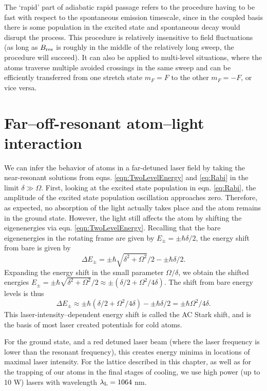 The \lq{rapid}\rq{} part of adiabatic rapid passage refers to the procedure having to be fast with respect to the spontaneous emission timescale, since in the coupled basis there is some population in the excited state and spontaneous decay would disrupt the process. This procedure is relatively insensitive to field fluctuations (as long as $B_{\rm res}$ is roughly in the middle of the relatively long sweep, the procedure will succeed). It can also be applied to multi-level situations, where the atoms traverse multiple avoided crossings in the same sweep and can be efficiently transferred from one stretch state $m_F=F$ to the other $m_F=-F$, or vice versa. 



\section{Far--off-resonant atom--light interaction}\label{sec:FoRatomLight}

	We can infer the behavior of atoms in a far-detuned laser field by taking the near-resonant solutions from eqns. \ref{eqn:TwoLevelEnergy} and \ref{eq:Rabi} in the limit $\delta \gg \Omega$. First, looking at the excited state population in eqn. \ref{eq:Rabi}, the amplitude of the excited state population oscillation approaches zero. Therefore, as expected, no absorption of the light actually takes place and the atom remains in the ground state. 
	However, the light still affects the atom by shifting the eigenenergies via eqn. \ref{eqn:TwoLevelEnergy}. Recalling that the bare eigenenergies in the rotating frame are given by $E_{\pm}=\pm \hbar\delta/2$, the energy shift from bare is given by
\begin{equation}
\Delta E_{\pm} = \pm\hbar\sqrt{\delta^2+\Omega^2}/2 -\pm \hbar\delta/2.
\end{equation}
Expanding the energy shift in the small parameter $\Omega/\delta$, we obtain the shifted energies $E_{\pm} = \pm \hbar \sqrt{\delta^2 + \Omega^2}/2 \approx \pm (\delta/2 + \Omega^2/4\delta)$. The shift from bare energy levels is thus 
\begin{equation}
\Delta E_{\pm} \approx \pm \hbar(\delta/2 + \Omega^2/4\delta)-\pm \hbar\delta/2 = \pm \hbar \Omega^2/4\delta.
\end{equation}
This laser-intensity--dependent energy shift is called the AC Stark shift, and is the basis of most laser created potentials for cold atoms. 
	
For the ground state, and a red detuned laser beam (where the laser frequency is lower than the resonant frequency), this creates energy minima in locations of maximal laser intensity. For the lattice described in this chapter, as well as for the trapping of our atoms in the final stages of cooling, we use high power (up to 10 W) lasers with wavelength $\lambda_{\rm L} = 1064 $ nm. 

